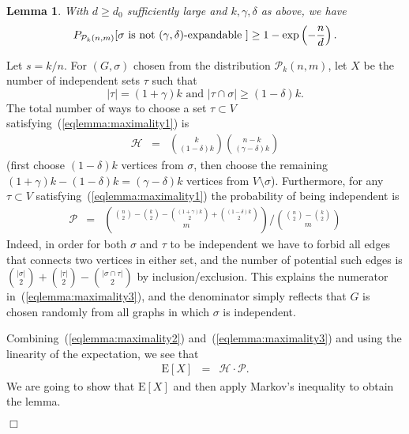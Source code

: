 \documentclass[a4paper,10pt]{article}
\makeatletter
\newtheorem{lemma}{Lemma}\renewcommand{\thelemma}{\arabic{lemma}}
\newenvironment{proof}{\noindent{\bf Proof\@:}}{\hfill $\Box$\\}
\newcommand\cH{\mathcal{H}}
\newcommand\cP{\mathcal{P}}
\newcommand\Erw{\mathrm{E}}
\newcommand{\bink}[2] {{{#1}\choose {#2}}}
\newcommand\brk[1]{\left\lbrack{#1}\right\rbrack}
\makeatother
\begin{document}
\begin{lemma}\label{lemma:maximality}
With $d\geq d_0$ sufficiently large and $k,\gamma,\delta$ as above, we have
\begin{displaymath}
P_{{\cal P}_k(n,m)}[\textrm{$\sigma$ is not $(\gamma,\delta)$-expandable }]\geq 1-\exp \left( -\frac{n}{d}\right).
\end{displaymath}
\end{lemma}
\begin{proof}
Let $s=k/n$.
For $(G,\sigma)$ chosen from the distribution $\cP_k(n,m)$,
let $X$ be the number of independent sets $\tau$ such that
	\begin{equation}\label{eqlemma:maximality1}
	|\tau|=(1+\gamma)k\mbox{ and }
	|\tau\cap\sigma|\geq(1-\delta)k.
	\end{equation}
The total number of ways to choose a set $\tau\subset V$ satisfying~(\ref{eqlemma:maximality1}) is
	\begin{eqnarray}\label{eqlemma:maximality2}
	\cH&=&\bink k{(1-\delta)k}\bink{n-k}{(\gamma-\delta)k}
	\end{eqnarray}
(first choose $(1-\delta)k$ vertices from $\sigma$, then choose the remaining $(1+\gamma)k-(1-\delta)k=(\gamma-\delta)k$
vertices from $V\setminus\sigma$).
Furthermore, for any $\tau\subset V$ satisfying~(\ref{eqlemma:maximality1}) the probability of being independent is
	\begin{eqnarray}\label{eqlemma:maximality3}
	\cP&=&\bink{\bink n2-\bink k2-\bink{(1+\gamma)k}2+\bink{(1-\delta)k}2}{m}/\bink{\bink{n}2-\bink k2}m
	\end{eqnarray}
Indeed, in order for both $\sigma$ and $\tau$ to be independent we have to forbid all edges
that connects two vertices in either set, and the number of potential such edges is
	$\bink{|\sigma|}2+\bink{|\tau|}2-\bink{|\sigma\cap\tau|}2$ by inclusion/exclusion.
This explains the numerator in~(\ref{eqlemma:maximality3}), and the denominator simply reflects that $G$ is chosen randomly
from all graphs in which $\sigma$ is independent.

Combining~(\ref{eqlemma:maximality2}) and~(\ref{eqlemma:maximality3}) and using the linearity of the expectation, we see that
	\begin{eqnarray}\label{eqlemma:maximality4}
	\Erw\brk X&=&\cH\cdot\cP.
	\end{eqnarray}
We are going to show that $\Erw\brk X$ and then apply Markov's inequality to obtain the lemma.


\end{proof}
\end{document}
